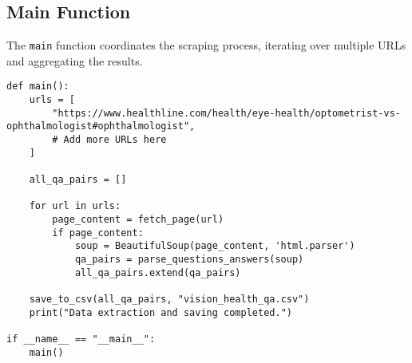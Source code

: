 \documentclass[a4paper,12pt]{article}
\begin{document}
\subsection{Main Function}
The \texttt{main} function coordinates the scraping process, iterating over multiple URLs and aggregating the results.

\begin{lstlisting}
def main():
    urls = [
        "https://www.healthline.com/health/eye-health/optometrist-vs-ophthalmologist#ophthalmologist",
        # Add more URLs here
    ]
    
    all_qa_pairs = []

    for url in urls:
        page_content = fetch_page(url)
        if page_content:
            soup = BeautifulSoup(page_content, 'html.parser')
            qa_pairs = parse_questions_answers(soup)
            all_qa_pairs.extend(qa_pairs)
    
    save_to_csv(all_qa_pairs, "vision_health_qa.csv")
    print("Data extraction and saving completed.")

if __name__ == "__main__":
    main()
\end{lstlisting}
\end{document}
